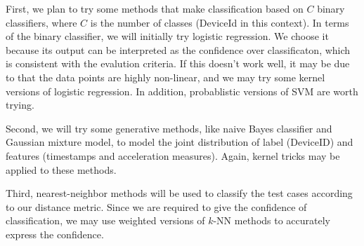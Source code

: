 \documentclass[12pt]{article}
\begin{document}
First, we plan to try some methods that make classification based on $C$ binary classifiers, where $C$ is the number of classes (DeviceId in this context). In terms of the binary classifier, we will initially try logistic regression. We choose it because its output can be interpreted as the confidence over classificaton, which is consistent with the evalution criteria. If this doesn't work well, it may be due to that the data points are highly non-linear, and we may try some kernel versions of logistic regression. In addition, probablistic versions of SVM are worth trying.

Second, we will try some generative methods, like naive Bayes classifier and Gaussian mixture model, to model the joint distribution of label (DeviceID) and features (timestamps and acceleration measures). Again, kernel tricks may be applied to these methods.

Third, nearest-neighbor methods will be used to classify the test cases according to our distance metric. Since we are required to give the confidence of classification, we may use weighted versions of $k$-NN methods to accurately express the confidence.
\end{document}
